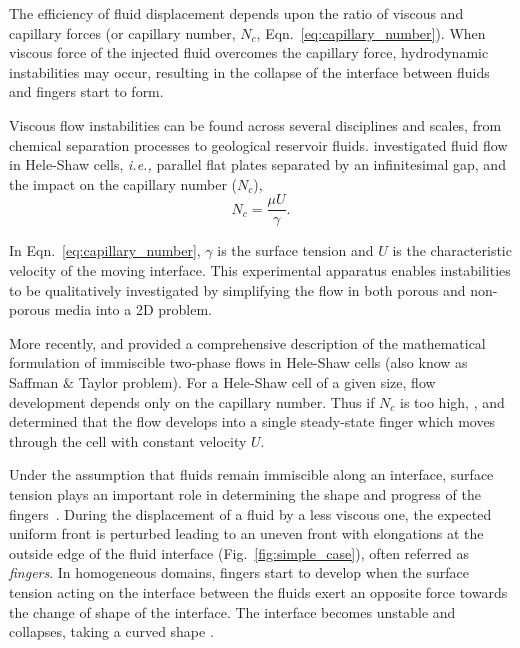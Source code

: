 \documentclass[preprint,authoryear,12pt]{elsarticle}
\newcommand{\ie}{{\it i.e., }}
\begin{document}
\medskip
The efficiency of fluid displacement depends upon the ratio of viscous and capillary forces (or capillary number, $N_{c}$, Eqn.~\ref{eq:capillary_number}). 
When viscous force of the injected fluid overcomes the capillary force, hydrodynamic instabilities may occur, resulting in the collapse of the interface between fluids and fingers start to form. 

\medskip
Viscous flow instabilities can be found across several disciplines and scales, from chemical separation processes to geological reservoir fluids. \citet{muskat_1934} investigated fluid flow in Hele-Shaw cells, \ie parallel flat plates separated by an infinitesimal gap, and the impact on the capillary number ($N_{c}$),
\begin{equation}
N_{c} = \frac{\mu U}{\gamma}.
\label{eq:capillary_number}
\end{equation}

\noindent In Eqn.~\ref{eq:capillary_number}, $\gamma$ is the surface tension and $U$ is the characteristic velocity of the moving interface. This experimental apparatus enables instabilities to be qualitatively investigated by simplifying the flow in both porous and non-porous media into a 2D problem.

\medskip
More recently, \citet{howison_2000} and \citet{praud_2005} provided a comprehensive description of the mathematical formulation of immiscible two-phase flows in Hele-Shaw cells (also know as Saffman $\&$ Taylor problem). For a Hele-Shaw cell of a given size, flow development depends only on the capillary number. Thus if \textit{$N_{c}$} is too high, \citet{saffman_1959}, \citet{homsy_1987} and \citet{tabeling_1987} determined that the flow develops into a single steady-state finger which moves through the cell with constant velocity $U$.

\medskip
 Under the assumption that fluids remain immiscible along an interface, surface tension plays an important role in determining the shape and progress of the fingers~\citep{howison_2000}. During the displacement of a fluid by a less viscous one, the expected uniform front \citep{buckley_1942,sheldon_1959} is perturbed leading to an uneven front with elongations at the outside edge of the fluid interface (Fig.~\ref{fig:simple_case}), often referred as \textit{fingers}. In homogeneous domains, fingers start to develop when the surface tension acting on the interface between the fluids exert an opposite force towards the change of shape of the interface. The interface becomes unstable and collapses, taking a curved shape \citep{homsy_1987, jackson_2017}. 
\end{document}
